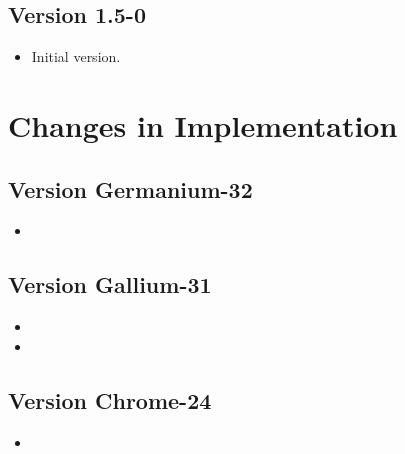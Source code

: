 \subsection*{Version 1.5-0}

\begin{itemize}
\item Initial version.
\end{itemize}


\ifthenelse%
    {}%
    {
\section{Changes in \eacsl Implementation}


\subsection*{Version Germanium-32}
\begin{itemize}
  \item {}
\end{itemize}

\subsection*{Version Gallium-31}
\begin{itemize}
  \item {}
  \item {}
\end{itemize}

\subsection*{Version Chrome-24}
\begin{itemize}
\item {}
\end{itemize}

}
